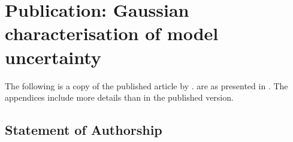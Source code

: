 
\chapter{Publication: Gaussian characterisation of model uncertainty}
The following is a copy of the published article by \citet{BlakeEtAl_2023_ExplicitGaussianCharacterisation}.
 are as presented in \cite{BlakeEtAl_2023_ExplicitGaussianCharacterisation}.
The appendices include more details than in the published version.

\section{Statement of Authorship}







